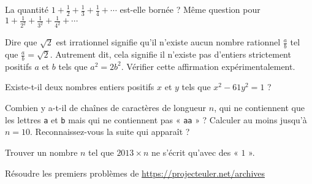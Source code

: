 % 
% 


\begin{question}
La quantité
$1 + \frac{1}{2} + \frac{1}{3} + \frac{1}{4} + \cdots$
est-elle bornée ?
Même question pour
$1 + \frac{1}{2^2} + \frac{1}{3^2} + \frac{1}{4^2} + \cdots$
\end{question}


\begin{question}
Dire que $\sqrt{2}$ est irrationnel signifie qu'il n'existe aucun nombre rationnel $\frac{a}{b}$ tel que $\frac{a}{b} = \sqrt{2}$.
Autrement dit, cela signifie il n'existe pas d'entiers strictement positifs $a$ et $b$ tels que $a^2 = 2b^2$.
Vérifier cette affirmation expérimentalement.
\end{question}


\begin{question}
Existe-t-il deux nombres entiers positifs $x$ et $y$ tels que $x^2 - 61y^2 = 1$ ?
\end{question}


\begin{question}
Combien y a-t-il de chaînes de caractères de longueur $n$,
qui ne contiennent que les lettres \texttt{a} et \texttt{b}
mais qui ne contiennent pas « \texttt{aa} » ?
Calculer au moins jusqu'à $n = 10$.
Reconnaissez-vous la suite qui apparaît ?
\end{question}


\begin{question}
Trouver un nombre $n$ tel que $2013 \times n$ ne s'écrit qu'avec des « $1$ ».
\end{question}

\begin{question}
    Résoudre les premiers problèmes de \url{https://projecteuler.net/archives}
\end{question}



